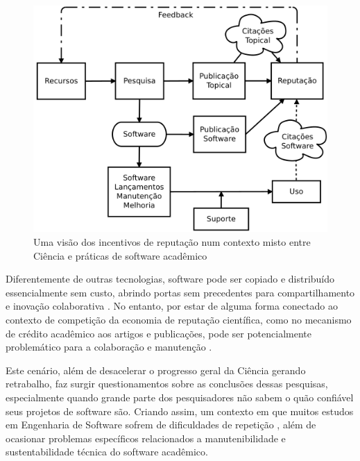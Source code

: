 \begin{figure}[h]
  \center
  \includegraphics[scale=0.35]{imagens/scientific-reputation-diagram.png}
  \caption{Uma visão dos incentivos de reputação num contexto misto entre Ciência e práticas de software acadêmico \cite{howison2011scientific}}
  \label{scientific-reputation-diagram}
\end{figure}

Diferentemente de outras tecnologias, software pode ser copiado e distribuído
essencialmente sem custo, abrindo portas sem precedentes para
compartilhamento e inovação colaborativa \cite{howison2011scientific}. No
entanto, por estar de alguma forma conectado ao contexto de competição da economia de
reputação científica, como no mecanismo de crédito acadêmico aos artigos e publicações,
pode ser potencialmente problemático para a colaboração e manutenção
\cite{howison2011scientific}.

Este cenário, além de desacelerar o progresso geral da Ciência gerando
retrabalho, faz surgir questionamentos sobre as conclusões dessas pesquisas,
especialmente quando grande parte dos pesquisadores não sabem o quão confiável
seus projetos de software são. Criando assim, um contexto em que muitos estudos
em Engenharia de Software sofrem de dificuldades de repetição
\cite{tang2016worthiness}, além de ocasionar problemas específicos relacionados a
manutenibilidade e sustentabilidade técnica do software acadêmico.
